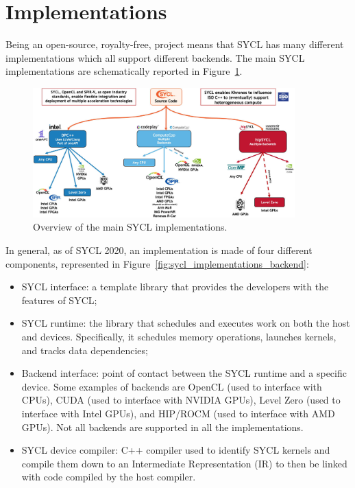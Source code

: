 \section{Implementations}
\label{ch:sycl_implementations}
Being an open-source, royalty-free, project means that SYCL has many different implementations which all support different backends. The main SYCL implementations are schematically reported in Figure~\ref{fig:sycl_implementations}.

\begin{figure}[H]
    \centering
    \includegraphics[width=0.9\textwidth]{media/sycl_implementations.jpg}
    \caption{Overview of the main SYCL implementations.}
    \label{fig:sycl_implementations}
\end{figure}

In general, as of SYCL 2020, an implementation is made of four different components, represented in Figure~\ref{fig:sycl_implementations_backend}: 
\begin{itemize}
    \item SYCL interface: a template library that provides the developers with the features of SYCL; 
    \item SYCL runtime: the library that schedules and executes work on both the host and devices. Specifically, it schedules memory operations, launches kernels, and tracks data dependencies;
    \item Backend interface: point of contact between the SYCL runtime and a specific device. Some examples of backends are OpenCL (used to interface with CPUs), CUDA (used to interface with NVIDIA GPUs), Level Zero (used to interface with Intel GPUs), and HIP/ROCM (used to interface with AMD GPUs). Not all backends are supported in all the implementations. 
    \item SYCL device compiler: C++ compiler used to identify SYCL kernels and compile them down to an Intermediate Representation (IR) to then be linked with code compiled by the host compiler.
\end{itemize}

